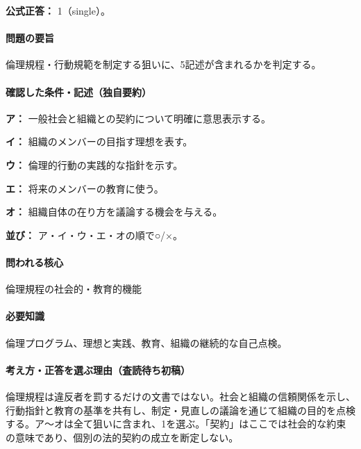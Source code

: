 \textbf{公式正答：} 1（single）。

\paragraph{問題の要旨} 倫理規程・行動規範を制定する狙いに、5記述が含まれるかを判定する。

\paragraph{確認した条件・記述（独自要約）}\mbox{}\par

\noindent\textbf{ア：} 一般社会と組織との契約について明確に意思表示する。\par

\noindent\textbf{イ：} 組織のメンバーの目指す理想を表す。\par

\noindent\textbf{ウ：} 倫理的行動の実践的な指針を示す。\par

\noindent\textbf{エ：} 将来のメンバーの教育に使う。\par

\noindent\textbf{オ：} 組織自体の在り方を議論する機会を与える。\par

\noindent\textbf{並び：} ア・イ・ウ・エ・オの順で○/×。\par

\paragraph{問われる核心} 倫理規程の社会的・教育的機能

\paragraph{必要知識} 倫理プログラム、理想と実践、教育、組織の継続的な自己点検。

\paragraph{考え方・正答を選ぶ理由（査読待ち初稿）} 倫理規程は違反者を罰するだけの文書ではない。社会と組織の信頼関係を示し、行動指針と教育の基準を共有し、制定・見直しの議論を通じて組織の目的を点検する。ア〜オは全て狙いに含まれ、1を選ぶ。「契約」はここでは社会的な約束の意味であり、個別の法的契約の成立を断定しない。

